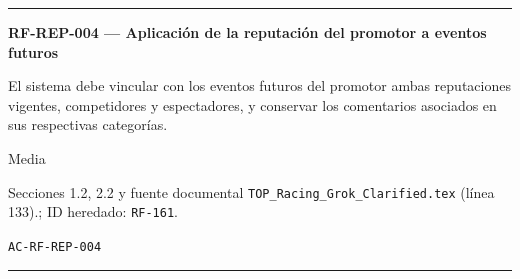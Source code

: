 \documentclass[10pt,letterpaper]{article}
\begin{document}
\vspace{0.25em}\hrule\vspace{0.65em}
\noindent\textbf{RF-REP-004 --- Aplicación de la reputación del promotor a eventos futuros}\par
\begin{description}[style=nextline,leftmargin=3.15cm,labelwidth=2.8cm,font=\normalfont\bfseries]
\item[Obligación] El sistema debe vincular con los eventos futuros del promotor ambas reputaciones vigentes, competidores y espectadores, y conservar los comentarios asociados en sus respectivas categorías.
\item[Prioridad] Media
\item[Procedencia] Secciones 1.2, 2.2 y fuente documental \texttt{TOP\_Racing\_Grok\_Clarified.tex} (línea 133).; ID heredado: \texttt{RF-161}.
\item[Verificación] \texttt{AC-RF-REP-004}
\end{description}
\vspace{0.25em}\hrule\vspace{0.65em}
\end{document}
